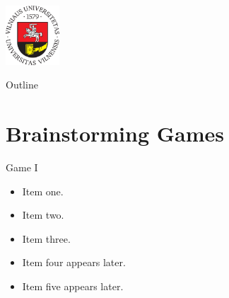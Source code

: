 

\begin{frame}

\begin{center}
\includegraphics[width=0.15\textwidth]{sp_VU_zenklas.pdf} \hspace{1cm}
\end{center}
\subtitle{BrainStorming}
\date{2014}
\titlepage

\end{frame}

\begin{frame}{Outline}
\tableofcontents
\end{frame}


\section{Brainstorming Games}

\begin{frame}{Game I}
\begin{itemize}
\item Item one.
\item Item two.
\item Item three.
\item<2->Item four appears later.
\item<3->{\color{vured}{\bf Question. } Item five appears later.}
\end{itemize}
\end{frame}











